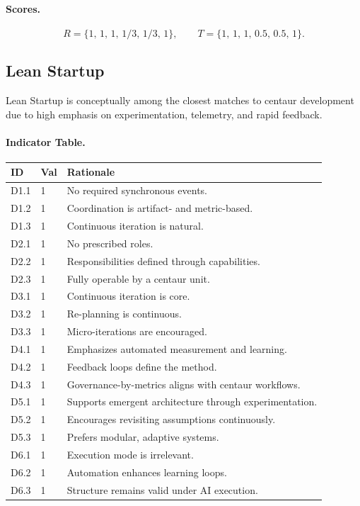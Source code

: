 \documentclass[11pt, a4paper, twocolumn]{article} %
\begin{document}
\paragraph{Scores.}

\[
R = \{1,\,1,\,1,\,1/3,\,1/3,\,1\},\qquad
T = \{1,\,1,\,1,\,0.5,\,0.5,\,1\}.
\]

\newpage
\subsection*{Lean Startup}

Lean Startup \citep{ries2011lean} is conceptually among the closest matches to
centaur development due to high emphasis on experimentation, telemetry, and
rapid feedback.

\paragraph{Indicator Table.}

\begin{table}[h]
\centering
\begin{tabular}{llp{10.5cm}}
\toprule
\textbf{ID} & \textbf{Val} & \textbf{Rationale} \\
\midrule
D1.1 & 1 & No required synchronous events. \\
D1.2 & 1 & Coordination is artifact- and metric-based. \\
D1.3 & 1 & Continuous iteration is natural. \\
\midrule
D2.1 & 1 & No prescribed roles. \\
D2.2 & 1 & Responsibilities defined through capabilities. \\
D2.3 & 1 & Fully operable by a centaur unit. \\
\midrule
D3.1 & 1 & Continuous iteration is core. \\
D3.2 & 1 & Re-planning is continuous. \\
D3.3 & 1 & Micro-iterations are encouraged. \\
\midrule
D4.1 & 1 & Emphasizes automated measurement and learning. \\
D4.2 & 1 & Feedback loops define the method. \\
D4.3 & 1 & Governance-by-metrics aligns with centaur workflows. \\
\midrule
D5.1 & 1 & Supports emergent architecture through experimentation. \\
D5.2 & 1 & Encourages revisiting assumptions continuously. \\
D5.3 & 1 & Prefers modular, adaptive systems. \\
\midrule
D6.1 & 1 & Execution mode is irrelevant. \\
D6.2 & 1 & Automation enhances learning loops. \\
D6.3 & 1 & Structure remains valid under AI execution. \\
\bottomrule
\end{tabular}
\end{table}
\end{document}
